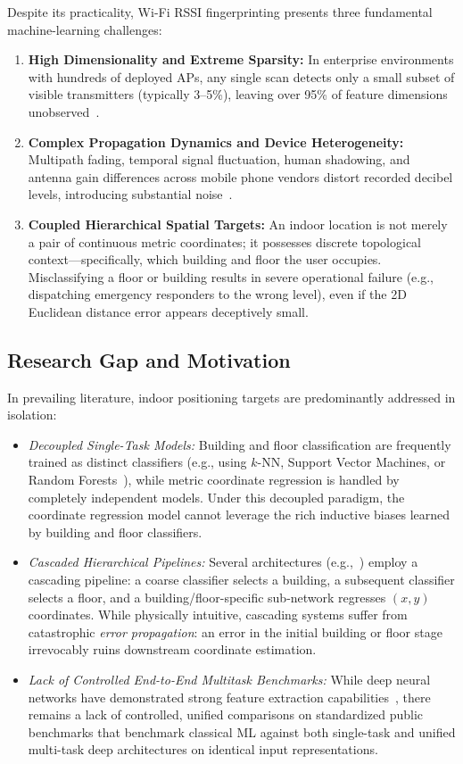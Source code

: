 Despite its practicality, Wi-Fi RSSI fingerprinting presents three fundamental machine-learning challenges:
\begin{enumerate}
    \item \textbf{High Dimensionality and Extreme Sparsity:} In enterprise environments with hundreds of deployed APs, any single scan detects only a small subset of visible transmitters (typically 3--5\%), leaving over 95\% of feature dimensions unobserved~\cite{torres2014ujiindoorloc}.
    \item \textbf{Complex Propagation Dynamics and Device Heterogeneity:} Multipath fading, temporal signal fluctuation, human shadowing, and antenna gain differences across mobile phone vendors distort recorded decibel levels, introducing substantial noise~\cite{torres2015comprehensive}.
    \item \textbf{Coupled Hierarchical Spatial Targets:} An indoor location is not merely a pair of continuous metric coordinates; it possesses discrete topological context—specifically, which building and floor the user occupies. Misclassifying a floor or building results in severe operational failure (e.g., dispatching emergency responders to the wrong level), even if the 2D Euclidean distance error appears deceptively small.
\end{enumerate}

\subsection{Research Gap and Motivation}
In prevailing literature, indoor positioning targets are predominantly addressed in isolation:
\begin{itemize}
    \item \emph{Decoupled Single-Task Models:} Building and floor classification are frequently trained as distinct classifiers (e.g., using $k$-NN, Support Vector Machines, or Random Forests~\cite{salamah2016enhanced}), while metric coordinate regression is handled by completely independent models. Under this decoupled paradigm, the coordinate regression model cannot leverage the rich inductive biases learned by building and floor classifiers.
    \item \emph{Cascaded Hierarchical Pipelines:} Several architectures (e.g.,~\cite{kim2018scalable}) employ a cascading pipeline: a coarse classifier selects a building, a subsequent classifier selects a floor, and a building/floor-specific sub-network regresses $(x, y)$ coordinates. While physically intuitive, cascading systems suffer from catastrophic \emph{error propagation}: an error in the initial building or floor stage irrevocably ruins downstream coordinate estimation.
    \item \emph{Lack of Controlled End-to-End Multitask Benchmarks:} While deep neural networks have demonstrated strong feature extraction capabilities~\cite{nowicki2017low, song2019cnnloc}, there remains a lack of controlled, unified comparisons on standardized public benchmarks that benchmark classical ML against both single-task and unified multi-task deep architectures on identical input representations.
\end{itemize}

